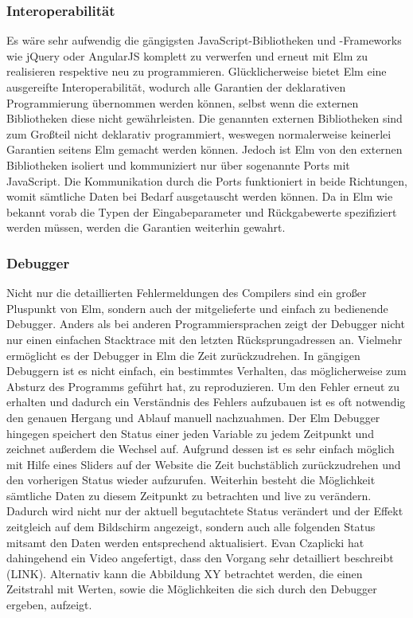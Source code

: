 \subsubsection{Interoperabilität}
\label{sec:Interoperabilität}
Es wäre sehr aufwendig die gängigsten JavaScript-Bibliotheken und -Frameworks wie jQuery oder AngularJS komplett zu verwerfen und erneut mit Elm zu realisieren respektive neu zu programmieren. Glücklicherweise bietet Elm eine ausgereifte Interoperabilität, wodurch alle Garantien der deklarativen Programmierung übernommen werden können, selbst wenn die externen Bibliotheken diese nicht gewährleisten.
Die genannten externen Bibliotheken sind zum Großteil nicht deklarativ programmiert, weswegen normalerweise keinerlei Garantien seitens Elm gemacht werden können. Jedoch ist Elm von den externen Bibliotheken isoliert und kommuniziert nur über sogenannte Ports mit JavaScript. Die Kommunikation durch die Ports funktioniert in beide Richtungen, womit sämtliche Daten bei Bedarf ausgetauscht werden können. Da in Elm wie bekannt vorab die Typen der Eingabeparameter und Rückgabewerte spezifiziert werden müssen, werden die Garantien weiterhin gewahrt.

\subsubsection{Debugger}
\label{sec:Debugger}
Nicht nur die detaillierten Fehlermeldungen des Compilers sind ein großer Pluspunkt von Elm, sondern auch der mitgelieferte und einfach zu bedienende Debugger. Anders als bei anderen Programmiersprachen zeigt der Debugger nicht nur einen einfachen Stacktrace mit den letzten Rücksprungadressen an. Vielmehr ermöglicht es der Debugger in Elm die Zeit zurückzudrehen. In gängigen Debuggern ist es nicht einfach, ein bestimmtes Verhalten, das möglicherweise zum Absturz des Programms geführt hat, zu reproduzieren. Um den Fehler erneut zu erhalten und dadurch ein Verständnis des Fehlers aufzubauen ist es oft notwendig den genauen Hergang und Ablauf manuell nachzuahmen. Der Elm Debugger hingegen speichert den Status einer jeden Variable zu jedem Zeitpunkt und zeichnet außerdem die Wechsel auf. Aufgrund dessen ist es sehr einfach möglich mit Hilfe eines Sliders auf der Website die Zeit buchstäblich zurückzudrehen und den vorherigen Status wieder aufzurufen. Weiterhin besteht die Möglichkeit sämtliche Daten zu diesem Zeitpunkt zu betrachten und live zu verändern. Dadurch wird nicht nur der aktuell begutachtete Status verändert und der Effekt zeitgleich auf dem Bildschirm angezeigt, sondern auch alle folgenden Status mitsamt den Daten werden entsprechend aktualisiert. Evan Czaplicki hat dahingehend ein Video angefertigt, dass den Vorgang sehr detailliert beschreibt (LINK). Alternativ kann die Abbildung XY betrachtet werden, die einen Zeitstrahl mit Werten, sowie die Möglichkeiten die sich durch den Debugger ergeben, aufzeigt.


